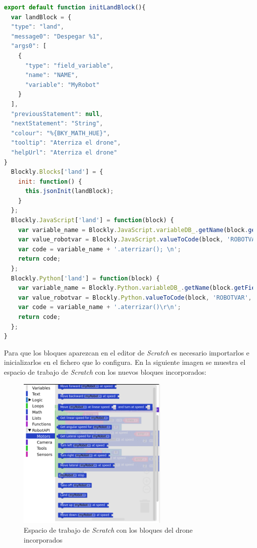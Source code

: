 \begin{lstlisting}[language=javascript,label=lst:tradAterrizar]
export default function initLandBlock(){
  var landBlock = {
  "type": "land",
  "message0": "Despegar %1",
  "args0": [
    {
      "type": "field_variable",
      "name": "NAME",
      "variable": "MyRobot"
    }
  ],
  "previousStatement": null,
  "nextStatement": "String",
  "colour": "%{BKY_MATH_HUE}",
  "tooltip": "Aterriza el drone",
  "helpUrl": "Aterriza el drone"
}
  Blockly.Blocks['land'] = {
    init: function() {
      this.jsonInit(landBlock);
    }
  };
  Blockly.JavaScript['land'] = function(block) {
    var variable_name = Blockly.JavaScript.variableDB_.getName(block.getFieldValue('NAME'), Blockly.Variables.NAME_TYPE);
    var value_robotvar = Blockly.JavaScript.valueToCode(block, 'ROBOTVAR', Blockly.JavaScript.ORDER_ATOMIC);
    var code = variable_name + '.aterrizar(); \n';
    return code;
  };
  Blockly.Python['land'] = function(block) {
    var variable_name = Blockly.Python.variableDB_.getName(block.getFieldValue('NAME'), Blockly.Variables.NAME_TYPE);
    var value_robotvar = Blockly.Python.valueToCode(block, 'ROBOTVAR', Blockly.Python.ORDER_ATOMIC);
    var code = variable_name + '.aterrizar()\r\n';
    return code;
  };
}
\end{lstlisting}

Para que los bloques aparezcan en el editor de \textit{Scratch} es necesario importarlos e inicializarlos en el fichero que lo configura. En la siguiente imagen se muestra el espacio de trabajo de \textit{Scratch} con los nuevos bloques incorporados:

\begin{figure}[H]
    \centering            \includegraphics[width=0.65\textwidth]{img/kibotics_newblocks.png}
    \caption{Espacio de trabajo de \textit{Scratch} con los bloques del drone incorporados} 
    \label{fig:newblocks}
\end{figure}

